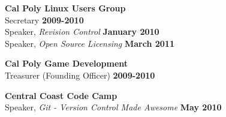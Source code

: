 \documentclass[margin,line]{resume}
\begin{document}
\begin{resume}
    \textbf{\listing Cal Poly Linux Users Group}\\
    Secretary \hfill \textbf{2009-2010}\\
    Speaker, \textsl{Revision Control} \hfill \textbf{January 2010}\\
    Speaker, \textsl{Open Source Licensing} \hfill \textbf{March 2011}

    \textbf{\listing Cal Poly Game Development}\\
    Treasurer (Founding Officer) \hfill \textbf{2009-2010}

    \textbf{\listing Central Coast Code Camp}\\
    Speaker, \textsl{Git - Version Control Made Awesome} \hfill \textbf{May 2010}


\end{resume}
\end{document}
